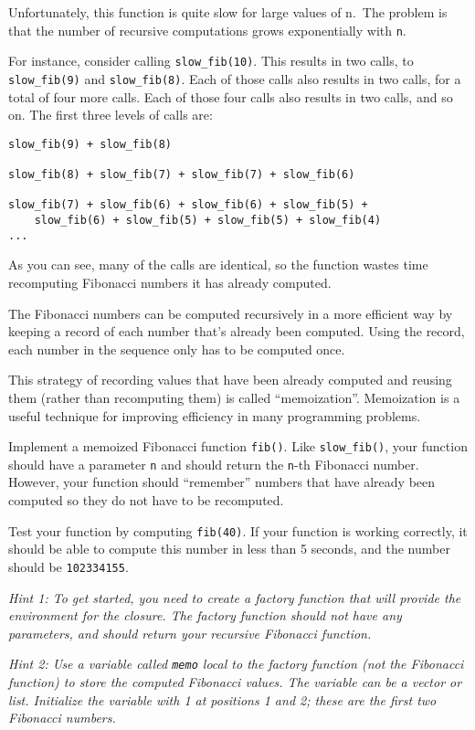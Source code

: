 \documentclass[
]{article}
\begin{document}
Unfortunately, this function is quite slow for large values of n.~The
problem is that the number of recursive computations grows exponentially
with \texttt{n}.

For instance, consider calling \texttt{slow\_fib(10)}. This results in
two calls, to \texttt{slow\_fib(9)} and \texttt{slow\_fib(8)}. Each of
those calls also results in two calls, for a total of four more calls.
Each of those four calls also results in two calls, and so on. The first
three levels of calls are:

\begin{verbatim}
slow_fib(9) + slow_fib(8)

slow_fib(8) + slow_fib(7) + slow_fib(7) + slow_fib(6)

slow_fib(7) + slow_fib(6) + slow_fib(6) + slow_fib(5) +
    slow_fib(6) + slow_fib(5) + slow_fib(5) + slow_fib(4)
...
\end{verbatim}

As you can see, many of the calls are identical, so the function wastes
time recomputing Fibonacci numbers it has already computed.

The Fibonacci numbers can be computed recursively in a more efficient
way by keeping a record of each number that's already been computed.
Using the record, each number in the sequence only has to be computed
once.

This strategy of recording values that have been already computed and
reusing them (rather than recomputing them) is called ``memoization''.
Memoization is a useful technique for improving efficiency in many
programming problems.

Implement a memoized Fibonacci function \texttt{fib()}. Like
\texttt{slow\_fib()}, your function should have a parameter \texttt{n}
and should return the \texttt{n}-th Fibonacci number. However, your
function should ``remember'' numbers that have already been computed so
they do not have to be recomputed.

Test your function by computing \texttt{fib(40)}. If your function is
working correctly, it should be able to compute this number in less than
5 seconds, and the number should be \texttt{102334155}.

\emph{Hint 1: To get started, you need to create a factory function that
will provide the environment for the closure. The factory function
should not have any parameters, and should return your recursive
Fibonacci function.}

\emph{Hint 2: Use a variable called \texttt{memo} local to the factory
function (not the Fibonacci function) to store the computed Fibonacci
values. The variable can be a vector or list. Initialize the variable
with 1 at positions 1 and 2; these are the first two Fibonacci numbers.}
\end{document}
